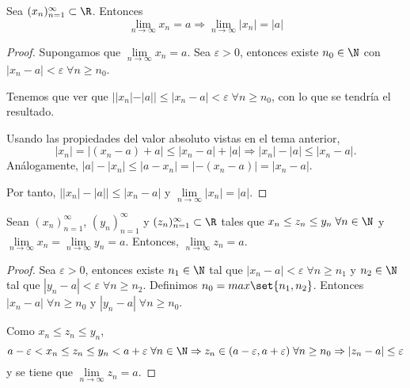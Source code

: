 \vspace{1cm}
\begin{proposition}
	Sea \((x_n)^{\infty}_{n = 1} \subset \R\). Entonces
	\[
		\lim\limits_{n \to \infty} x_n = a \Rightarrow \lim\limits_{n \to \infty} |x_n| = |a|
	\]
\end{proposition}
\begin{proof}
	Supongamos que \(\lim\limits_{n \to \infty} x_n = a \). Sea \(\varepsilon > 0 \), entonces existe \(n_0 \in \N \) con \(|x_n - a| < \varepsilon \; \forall n \geq n_0\).
	
	Tenemos que ver que \(| |x_n| - |a| | \leq \left\vert x_n - a  \right\vert < \varepsilon \; \forall n \geq n_0 \), con lo que se tendría el resultado.
	
	Usando las propiedades del valor absoluto vistas en el tema anterior,
	\[|x_n| = \left\vert (x_n-a) + a \right\vert \leq \left\vert x_n-a  \right\vert  + \left\vert a  \right\vert \Rightarrow \left\vert x_n  \right\vert - \left\vert a  \right\vert \leq \left\vert x_n-a  \right\vert.
	\]
	Análogamente, \(\left\vert a  \right\vert - \left\vert x_n  \right\vert \leq \left\vert a - x_n \right\vert = \left\vert -(x_n-a) \right\vert = \left\vert x_n-a  \right\vert \).
	
	Por tanto, \(\left\vert \left\vert x_n  \right\vert - \left\vert a  \right\vert  \right\vert \leq \left\vert x_n - a  \right\vert\) y \(\lim\limits_{n \to \infty} \left\vert x_n  \right\vert = \left\vert a  \right\vert \).
\end{proof}

\begin{proposition}
	Sean \((x_n)^{\infty}_{n = 1} \), \((y_n)^{\infty}_{n = 1} \) y \((z_n)^{\infty}_{n=1} \subset \R\) tales que \(x_n \leq z_n \leq y_n \; \forall n \in \N \) y \(\lim\limits_{n \to \infty} x_n = \lim\limits_{n \to \infty} y_n = a \). Entonces, \(\lim\limits_{n \to \infty} z_n = a \).
\end{proposition}
\begin{proof}
	Sea \(\varepsilon > 0 \), entonces existe \(n_1 \in \N \) tal que \(\left\vert x_n - a  \right\vert < \varepsilon \; \forall n \geq n_1 \) y \(n_2 \in \N \) tal que \(\left\vert y_n - a  \right\vert < \varepsilon \; \forall n \geq n_2 \). Definimos \(n_0 = max\set{n_1,n_2 }\). Entonces \(\left\vert x_n - a  \right\vert \; \forall n \geq n_0 \)  y \(\left\vert y_n - a  \right\vert \; \forall n \geq n_0 \).
	
	Como \(x_n \leq z_n \leq y_n \), \[
		a - \varepsilon < x_n \leq z_n \leq y_n < a + \varepsilon \; \forall n \in \N \Rightarrow z_n \in (a-\varepsilon,a+\varepsilon) \; \forall n \geq n_0 \Rightarrow |z_n - a| \leq \varepsilon
	\] y se tiene que \(\lim\limits_{n \to \infty} z_n = a\).
\end{proof}


